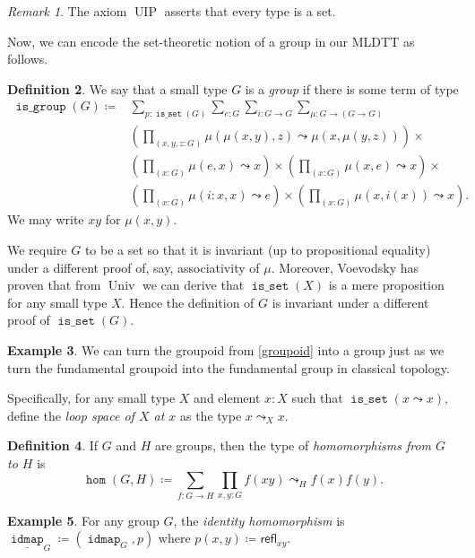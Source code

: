 \documentclass[10pt,letterpaper,cm]{nupset}
\theoremstyle{definition}
\newtheorem{definition}{Definition}[subsection]
\newtheorem{exmp}[definition]{Example}
\theoremstyle{theorem}
\theoremstyle{remark}
\newtheorem{remark}[definition]{Remark}
\newcommand{\refl}{\mathsf{refl}}
\newcommand{\0}{\mathbf{0}}
\newcommand{\1}{\mathbf{1}}
\newcommand{\2}{\mathbf{2}}
\DeclareMathOperator{\idmap}{\mathtt{idmap}}
\DeclareMathOperator{\isset}{\mathtt{is\_set}}
\DeclareMathOperator{\isgrp}{\mathtt{is\_group}}
\DeclareMathOperator{\homm}{\mathtt{hom}}
\DeclareMathOperator{\univ}{\mathrm{Univ}}
\DeclareMathOperator{\uip}{\mathrm{UIP}}
\begin{document}
\begin{remark}
The axiom $\uip$ asserts that every type is a set.
\end{remark}

Now, we can encode the set-theoretic notion  of a group  in our MLDTT as follows. 

\begin{definition}
We say that a small type $G$ is a \textit{group} if there is some term of type 
\begin{align*}
\isgrp(G) \coloneqq & \sum_{p : \isset(G)} \sum_{e : G}\sum_{i: G \to G}\sum_{\mu : G \to (G \to G)}
\\ & \left(\prod_{(x, y, z : G)} \mu(\mu(x, y), z) \leadsto \mu(x, \mu(y, z))\right) \times
\\ & \left(\prod_{(x : G)} \mu(e, x) \leadsto x\right) \times\left(\prod_{(x : G)} \mu(x, e) \leadsto x\right) \times
\\ & \left(\prod_{(x : G)} \mu(i : x, x)\leadsto e\right) \times\left(\prod_{(x : G)} \mu(x, i(x))\leadsto x\right)
.
\end{align*} We may write $xy$ for $\mu(x,y)$. 
\end{definition}

We require $G$ to be a set so that it is invariant (up to propositional equality) under a different proof of, say, associativity of $\mu$. Moreover, Voevodsky has proven that from $\univ$ we can derive that $\isset(X)$ is a mere proposition for any small type $X$. Hence the definition of $G$ is invariant under a different proof of $\isset(G)$.

\begin{exmp}
We can turn the groupoid from \cref{groupoid} into a group just as we turn the fundamental groupoid into the fundamental group in classical topology.  
\smallskip

Specifically, for any small type $X$ and element $x:X$ such that $\isset(x\leadsto x)$, define the \textit{loop space of $X$ at $x$} as the type $ x \leadsto_X x. $
\end{exmp}

\begin{definition}
 If $G$ and $H$ are groups, then the type of \textit{homomorphisms from $G$ to $H$} is $$ \homm(G, H) \coloneqq
 \sum_{f: G\to H}\prod_{x,y:G}f(xy) \leadsto_{H} f(x)f(y)
     .$$ 
\end{definition} 

\begin{exmp}
For any group $G$, the \textit{identity homomorphism} is $\underline{\idmap}_G \coloneqq (\idmap_G, p)$ where $p(x,y) \coloneqq \refl_{xy}$.
\end{exmp}
\end{document}
